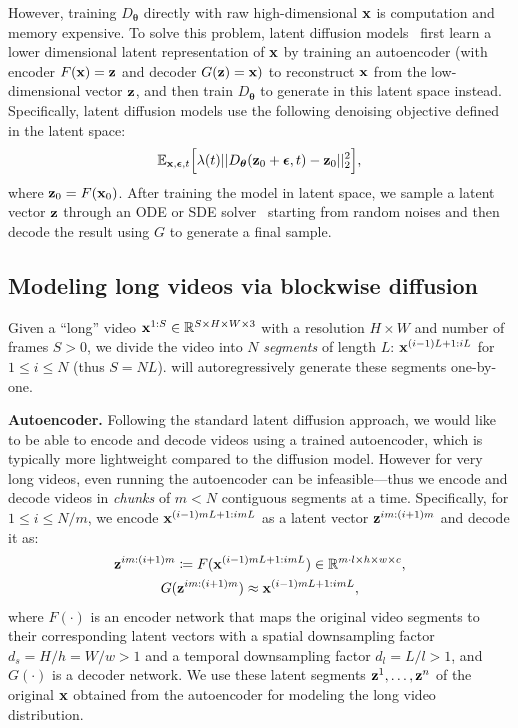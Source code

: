However, training $D_{\bm{\theta}}$ directly with raw high-dimensional $\mathbf{x}$ is computation and memory expensive. To solve this problem, latent diffusion models~\citep{rombach2021highresolution} first learn a 
lower dimensional latent representation of $\mathbf{x}$ by training an autoencoder (with encoder $F(\mathbf{x}) = \mathbf{z}$ and 
decoder $G(\mathbf{z}) = \mathbf{x})$ to reconstruct $\mathbf{x}$ from 
the low-dimensional vector $\mathbf{z}$, and then train $D_{\bm{\theta}}$ to generate in this latent space instead.
Specifically, latent diffusion models use the following denoising objective defined in the latent space:
\begin{align*}
    \mathbb{E}_{\mathbf{x}, \bm{\epsilon}, t}\Big[ \lambda(t) || D_{\bm{\theta}}(\mathbf{z}_0 + \bm{\epsilon}, t)  - \mathbf{\mathbf{z}}_0||_2^2 \Big],
\end{align*}
where $\mathbf{z}_0=F(\mathbf{x}_0)$. After training the model in latent space, we sample a latent vector $\mathbf{z}$ through an ODE or SDE solver~\citep{song2021denoising,song2021scorebased,karras2022edm} starting from random noises and then decode the result using $G$ to generate
a final sample.

\subsection{Modeling long videos via blockwise diffusion}
\label{subsec:obj}

Given a ``long'' video $\mathbf{x}^{1:S} \in \mathbb{R}^{S \times H \times W \times 3}$ with a resolution $H \times W$ and number of frames $S>0$, we divide the video into $N$ \emph{segments} of length $L$: $\mathbf{x}^{(i-1)L+1:iL}$ for $1\leq i \leq N$ (thus $S=NL$). \sname will autoregressively generate
these segments one-by-one.

\vspace{0.02in}
\noindent\textbf{Autoencoder.}
Following the standard latent diffusion approach, we would like to be able to encode and decode 
videos using a trained autoencoder, which is typically more lightweight 
compared to the diffusion model.  However for very long videos, even running the autoencoder
can be infeasible---thus we encode and decode videos in \emph{chunks} of $m<N$ contiguous segments at a time.  Specifically, for $1 \leq i \leq N/m$, we encode $\mathbf{x}^{(i-1)mL+1:imL}$ as a latent vector $\mathbf{z}^{im:(i+1)m}$ and decode it as:
\begin{gather*}
    \mathbf{z}^{im:(i+1)m}\coloneqq F(\mathbf{x}^{(i-1)mL+1:imL}) \in \mathbb{R}^{m\cdot l \times h \times w \times c}, \\
    G(\mathbf{z}^{im:(i+1)m})\approx \mathbf{x}^{(i-1)mL+1:imL},
\end{gather*}
where $F(\cdot)$ is an encoder network that maps the original video segments to their corresponding latent vectors with a spatial downsampling factor $d_s = H/h = W/w > 1$ and a temporal downsampling factor $d_l = L/l > 1$, and $G(\cdot)$ is a decoder network. We use these latent segments $\mathbf{z}^{1}, \ldots, \mathbf{z}^{n}$ of the original $\mathbf{x}$ obtained from the autoencoder for modeling the long video distribution.

